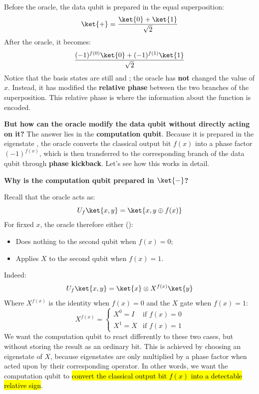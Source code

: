 \highspace
Before the oracle, the data qubit is prepared in the equal superposition:
\begin{equation*}
    \ket{+} = \frac{\ket{0} + \ket{1}}{\sqrt{2}}
\end{equation*}
After the oracle, it becomes:
\begin{equation*}
    \frac{(-1)^{f(0)}\ket{0} + (-1)^{f(1)}\ket{1}}{\sqrt{2}}
\end{equation*}
Notice that the basis states are still  and ; the oracle has \textbf{not} changed the value of $x$. Instead, it has modified the \textbf{relative phase} between the two branches of the superposition. This relative phase is where the information about the function is encoded.

\highspace
\textcolor{Green3}{ \textbf{But how can the oracle modify the data qubit without directly acting on it?}} The answer lies in the \textbf{computation qubit}. Because it is prepared in the eigenstate \ket{-}, the oracle converts the classical output bit $f(x)$ into a phase factor $(-1)^{f(x)}$, which is then transferred to the corresponding branch of the data qubit through \textbf{phase kickback}. Let's see how this works in detail.

\highspace
\begin{flushleft}
    \textcolor{Green3}{ \textbf{Why is the computation qubit prepared in $\ket{-}$?}}
\end{flushleft}
Recall that the oracle acts as:
\begin{equation*}
    U_f \ket{x, y} = \ket{x, y \oplus f(x)}
\end{equation*}
For firxed $x$, the oracle therefore either ():
\begin{itemize}
    \item Does nothing to the second qubit when $f(x) = 0$;
    \item Applies $X$ to the second qubit when $f(x) = 1$.
\end{itemize}
Indeed:
\begin{equation*}
    U_f \ket{x,y} = \ket{x} \otimes X^{f(x)} \ket{y}
\end{equation*}
Where $X^{f(x)}$ is the identity when $f(x) = 0$ and the $X$ gate when $f(x) = 1$:
\begin{equation*}
    X^{f(x)} = \begin{cases}
        X^{0} = I & \text{if } f(x) = 0 \\
        X^{1} = X & \text{if } f(x) = 1
    \end{cases}
\end{equation*}
We want the computation qubit to react differently to these two cases, but without storing the result as an ordinary bit. This is achieved by choosing an eigenstate of $X$, because eigenstates are only multiplied by a phase factor when acted upon by their corresponding operator. In other words, we want the computation qubit to \hl{convert the classical output bit $f(x)$ into a detectable relative sign}.

